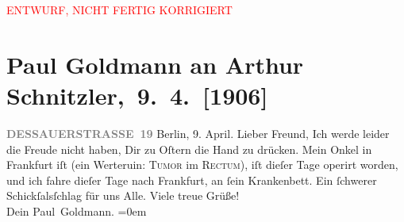 
\begin{center}
            \textcolor{red}{ENTWURF, NICHT FERTIG KORRIGIERT}
                      \end{center}
            
         
         \renewcommand{\erwaehntePersonen}{Personen: Fedor Mamroth}
         \renewcommand{\erwaehnteOrte}{Orte: Berlin, Dessauer Straße, Frankfurt am Main, Wien}
         \renewcommand{\erwaehnteWerke}{}
               \section[ Paul Goldmann an Arthur Schnitzler, 9. 4. {[}1906{]}]{ Paul Goldmann an Arthur Schnitzler, 9. 4. {[}1906{]}}\nopagebreak{}\rehead{ }\begin{ledgroupsized}[t]{13cm}\normalsize\beginnumbering \toendnotes[C]{\smallbreak\pagebreak[2]} 
\toendnotes[C]{\smallbreak}\pstart
           \noindent{}\raggedleft{}{\pb}\textcolor{gray}{\textbf{DESSAUERSTRASSE 19}}\pend
           \pstart
           Berlin, 9.
                     April.\pend
           \pstart{}Lieber Freund,\pend\pstart
           Ich werde leider die Freude nicht haben, Dir zu Oſtern
               die Hand zu drücken. Mein Onkel in Frankfurt iſt \label{K-L03242-1v}\label{K-L03242-1h} (ein
               Werteruin: \textsc{Tumor} im \textsc{Rectum}), iſt
               dieſer Tage operirt worden, und ich fahre dieſer Tage nach Frankfurt, an ſein Krankenbett. Ein ſchwerer Schickſalsſchlag
               für uns Alle.\pend
           \pstart
           Viele treue Grüße! {\\[\baselineskip]}Dein \spacefill\mbox{Paul Goldmann.}\pend
           \leftskip=0em{}
         
         \endnumbering{}\end{ledgroupsized}  \newcommand{\dateiname}{L03242}\newcommand{\titel}{Paul Goldmann an Arthur Schnitzler, 9. 4. [1906]}\newcommand{\editorInnen}{Martin Anton Müller und Laura Untner}
      